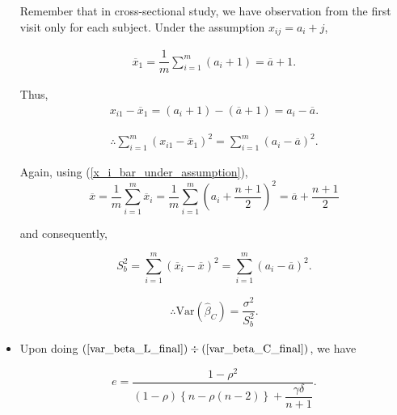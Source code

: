 \documentclass[11pt, a4paper]{article}
\begin{document}
\begin{itemize}
Remember that in cross-sectional study, we have observation from the first visit only for each subject. Under the assumption $x_{ij} = a_i + j$,

\begin{align*}
\overline{x}_1 = \dfrac{1}{m} \sum \limits_{i = 1}^{m} (a_i + 1) = \overline{a} + 1.
\end{align*}

Thus,
\begin{align*}
x_{i1} - \overline{x}_1 = (a_i + 1) - (\overline{a} + 1) = a_i - \overline{a}.
\end{align*}

\begin{align*}
\therefore \sum \limits_{i = 1}^{m} (x_{i1} - \bar{x}_1)^2 = \sum \limits_{i = 1}^{m} (a_i - \overline{a})^2.
\end{align*}

Again, using (\ref{x_i_bar_under_assumption}), $$\overline{x} = \dfrac{1}{m} \sum \limits_{i = 1}^{m} \overline{x}_i = \dfrac{1}{m} \sum \limits_{i = 1}^{m} \left( a_i + \dfrac{n+1}{2} \right)^2 = \overline{a} + \dfrac{n+1}{2}$$

and consequently,

$$S_b^2 = \sum \limits_{i = 1}^{m} (\overline{x}_{i} - \overline{x})^2 = \sum \limits_{i = 1}^{m} (a_i - \overline{a})^2.$$

\begin{align}\label{var_beta_C_final}
\therefore \text{Var}(\hat{\beta}_C) = \dfrac{\sigma^2}{S_b^2}.
\end{align}

\item[\scalebox{2.0}{\twemoji{keycap: 5}}] \hspace{0.2cm} Upon doing $(\ref{var_beta_L_final}) \div (\ref{var_beta_C_final})$, we have

$$e = \dfrac{1-\rho^2}{(1-\rho)\left\{n - \rho(n - 2)\right\} + \dfrac{\gamma \delta}{n+1}}.$$

\end{itemize}

\vspace{5em}

\begin{center}
\BlackRookOnBlack \BlackKnightOnWhite \BlackBishopOnBlack \BlackKingOnWhite \BlackQueenOnBlack \BlackBishopOnWhite \BlackKnightOnBlack \BlackRookOnWhite
\end{center}
\end{document}
